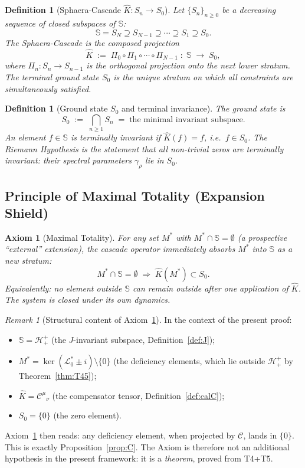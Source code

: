 \documentclass[12pt,a4paper]{article}
\newtheorem{definition}[theorem]{Definition}
\newtheorem{axiom}[theorem]{Axiom}
\theoremstyle{remark}
\newtheorem*{remark}{Remark}
\begin{document}
\begin{definition}[Sphaera-Cascade $\hat{K}:S_n\to S_0$]\label{def:cascade}
Let $\{S_n\}_{n\ge0}$ be a decreasing sequence of closed subspaces of $\mathbb{S}$:
\[
\mathbb{S} = S_N \supseteq S_{N-1} \supseteq \cdots \supseteq S_1 \supseteq S_0.
\]
The \emph{Sphaera-Cascade} is the composed projection
\[
\hat{K} \;:=\; \Pi_0 \circ \Pi_1 \circ \cdots \circ \Pi_{N-1}
\;:\; \mathbb{S} \;\longrightarrow\; S_0,
\]
where $\Pi_n : S_n \to S_{n-1}$ is the orthogonal projection
onto the next lower stratum.
The \emph{terminal ground state} $S_0$ is the unique stratum
on which all constraints are simultaneously satisfied.
\end{definition}

\begin{definition}[Ground state $S_0$ and terminal invariance]
\label{def:groundstate}
The ground state is
\[
S_0 \;:=\; \bigcap_{n\ge1} S_n \;=\; \text{the minimal invariant subspace}.
\]
An element $f\in\mathbb{S}$ is \emph{terminally invariant} if
$\hat{K}(f)=f$, i.e.\ $f\in S_0$.
The Riemann Hypothesis is the statement that all non-trivial zeros
are terminally invariant: their spectral parameters $\gamma_\rho$
lie in $S_0$.
\end{definition}

\subsection*{Principle of Maximal Totality (Expansion Shield)}

\begin{axiom}[Maximal Totality]\label{ax:MT}
For any set $M^*$ with $M^*\cap\mathbb{S}=\emptyset$
(a prospective ``external'' extension), the cascade operator
immediately absorbs $M^*$ into $\mathbb{S}$ as a new stratum:
\[
M^*\cap\mathbb{S}=\emptyset
\;\Longrightarrow\;
\hat{K}(M^*)\subset S_0.
\]
Equivalently: no element outside $\mathbb{S}$ can remain outside
after one application of $\hat{K}$.
The system is closed under its own dynamics.
\end{axiom}

\begin{remark}[Structural content of Axiom~\ref{ax:MT}]
In the context of the present proof:
\begin{itemize}
\item $\mathbb{S} = \mathcal{H}^+_+$ (the $J$-invariant subspace,
      Definition~\ref{def:J});
\item $M^* = \ker(\mathcal{L}_0^*\pm i)\setminus\{0\}$
      (the deficiency elements, which lie outside $\mathcal{H}^+_+$
      by Theorem~\ref{thm:T45});
\item $\hat{K} = \mathcal{C}^{\mu}{}_\nu$
      (the compensator tensor, Definition~\ref{def:calC});
\item $S_0 = \{0\}$ (the zero element).
\end{itemize}
Axiom~\ref{ax:MT} then reads: any deficiency element, when projected
by $\mathcal{C}$, lands in $\{0\}$.
This is exactly Proposition~\ref{prop:C}.
The Axiom is therefore not an additional hypothesis in the present
framework: it is a \emph{theorem}, proved from T4+T5.
\end{remark}
\end{document}
